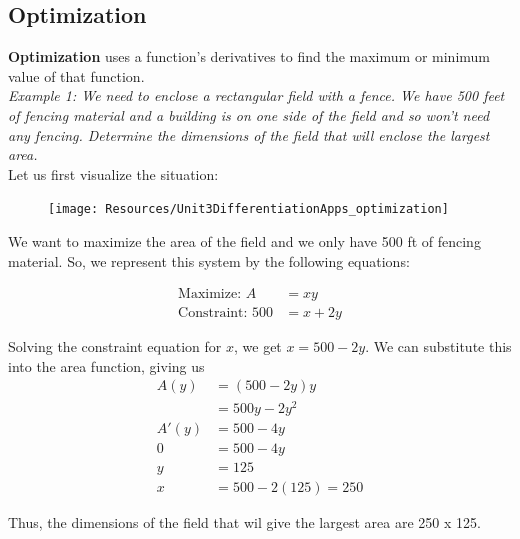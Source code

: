 \documentclass{article}
\begin{document}
    \subsection{Optimization}
        \textbf{Optimization} uses a function's derivatives to find the maximum or
        minimum value of that function. \\

        \noindent \color{blue} \textit{Example 1: We need to enclose a rectangular field with a
        fence. We have 500 feet of fencing material and a building is on one side of the field
        and so won't need any fencing. Determine the dimensions of the field that will enclose the
        largest area.} \color{black} \\

        \noindent Let us first visualize the situation:

        \begin{figure}
            \centering
            \texttt{[image: Resources/Unit3DifferentiationApps\_optimization]}
        \end{figure}

        \noindent We want to maximize the area of the field and we only have 500 ft of fencing
        material. So, we represent this system by the following equations:

        \begin{align*}
            \text{Maximize: } A     &= xy \\
            \text{Constraint: } 500 &= x + 2y
        \end{align*}

        \noindent Solving the constraint equation for $x$, we get $x=500-2y$. We can substitute this
        into the area function, giving us \\

        \begin{align*}
            A(y)  &= (500-2y)y \\
                  &= 500y-2y^2 \\
            A'(y) &= 500-4y \\
            0     &= 500 - 4y \\
            y     &= 125 \\
            x     &= 500-2(125) = 250
        \end{align*}

        \noindent Thus, the dimensions of the field that wil give the largest area are 250 x 125. \\
\end{document}
